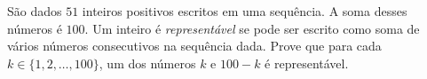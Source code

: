 São dados $51$ inteiros positivos escritos em uma sequência. A soma desses números é $100$. Um inteiro é \emph{representável} se pode ser escrito como soma de vários números consecutivos na sequência dada. Prove que para cada $k \in \{1, 2, \dots, 100\}$, um dos números $k$ e $100-k$ é representável.
